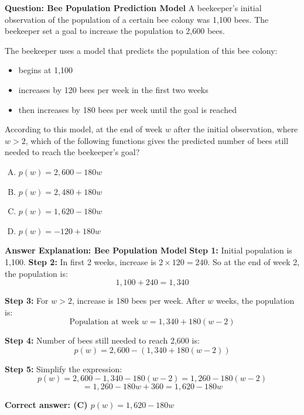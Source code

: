 \documentclass{beamer}
\begin{document}
\begin{frame}{\textbf{Question: Bee Population Prediction Model}}
A beekeeper’s initial observation of the population of a certain bee colony was 1,100 bees. The beekeeper set a goal to increase the population to 2,600 bees.

The beekeeper uses a model that predicts the population of this bee colony:
\begin{itemize}
    \item begins at 1,100
    \item increases by 120 bees per week in the first two weeks
    \item then increases by 180 bees per week until the goal is reached
\end{itemize}

According to this model, at the end of week \( w \) after the initial observation, where \( w > 2 \), which of the following functions gives the predicted number of bees still needed to reach the beekeeper’s goal?

\begin{enumerate}[A.]
    \item \( p(w) = 2,600 - 180w \)
    \item \( p(w) = 2,480 + 180w \)
    \item \( p(w) = 1,620 - 180w \)
    \item \( p(w) = -120 + 180w \)
\end{enumerate}
\end{frame}


\begin{frame}{\textbf{Answer Explanation: Bee Population Model }}
\small
\textbf{Step 1:} Initial population is 1,100.  
\textbf{Step 2:} In first 2 weeks, increase is \( 2 \times 120 = 240 \).  
So at the end of week 2, the population is:  
\[
1,100 + 240 = 1,340
\]

\pause

\textbf{Step 3:} For \( w > 2 \), increase is 180 bees per week.  
After \( w \) weeks, the population is:  
\[
\text{Population at week } w = 1,340 + 180(w - 2)
\]

\textbf{Step 4:} Number of bees still needed to reach 2,600 is:  
\[
p(w) = 2,600 - (1,340 + 180(w - 2))
\]

\pause

\textbf{Step 5:} Simplify the expression:
\[
p(w) = 2,600 - 1,340 - 180(w - 2)
= 1,260 - 180(w - 2)
\]
\[
= 1,260 - 180w + 360 = 1,620 - 180w
\]

\textbf{Correct answer: (C) \( \boxed{p(w) = 1,620 - 180w} \)}
\end{frame}
\end{document}
